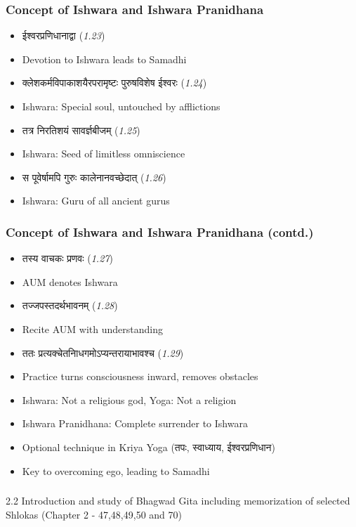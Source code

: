 \begin{frame}[fragile]\frametitle{Concept of Ishwara and Ishwara Pranidhana}
    \begin{itemize}
        \item ईश्वरप्रणिधानाद्वा (\textit{1.23})
        \item Devotion to Ishwara leads to Samadhi
        \item क्लेशकर्मविपाकाशयैरपरामृष्टः पुरुषविशेष ईश्वरः (\textit{1.24})
        \item Ishwara: Special soul, untouched by afflictions
        \item तत्र निरतिशयं सावर्ज्ञबीजम् (\textit{1.25})
        \item Ishwara: Seed of limitless omniscience
        \item स पूवेर्षामपि गुरुः कालेनानवच्छेदात् (\textit{1.26})
        \item Ishwara: Guru of all ancient gurus
    \end{itemize}
\end{frame}

\begin{frame}[fragile]\frametitle{Concept of Ishwara and Ishwara Pranidhana (contd.)}
    \begin{itemize}
        \item तस्य वाचकः प्रणवः (\textit{1.27})
        \item AUM denotes Ishwara
        \item तज्जपस्तदर्थभावनम् (\textit{1.28})
        \item Recite AUM with understanding
        \item ततः प्रत्यक्चेतनािधगमोऽप्यन्तरायाभावश्च (\textit{1.29})
        \item Practice turns consciousness inward, removes obstacles
        \item Ishwara: Not a religious god, Yoga: Not a religion
        \item Ishwara Pranidhana: Complete surrender to Ishwara
        \item Optional technique in Kriya Yoga (तपः, स्वाध्याय, ईश्वरप्रणिधान)
        \item Key to overcoming ego, leading to Samadhi
    \end{itemize}
\end{frame}

\begin{frame}[fragile]\frametitle{}
\begin{center}
{\Large 2.2 Introduction and study of Bhagwad Gita including memorization of selected Shlokas (Chapter 2 - 47,48,49,50 and 70)}
\end{center}
\end{frame}

